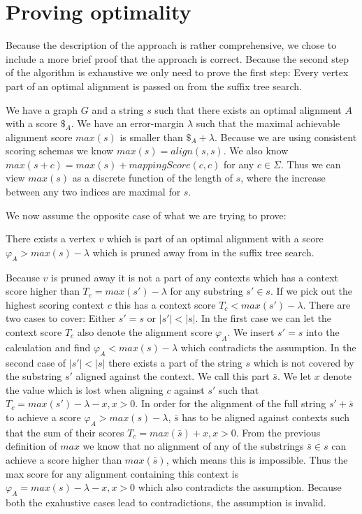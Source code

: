 \documentclass[thesis.tex]{subfiles}
\begin{document}
\chapter{Proving optimality}
\label{sec:proof}
Because the description of the approach is rather comprehensive, we chose to include a more brief proof that the approach is correct. Because the second step of the algorithm is exhaustive we only need to prove the first step: Every vertex part of an optimal alignment is passed on from the suffix tree search.\\
\par\noindent
We have a graph $G$ and a string $s$ such that there exists an optimal alignment $A$ with a score $\$_A$. We have an error-margin $\lambda$ such that the maximal achievable alignment score $max(s)$ is smaller than $\$_A + \lambda$. Because we are using consistent scoring schemas we know $max(s) = align(s, s)$. We also know $max(s+c)=max(s)+mappingScore(c, c)$ for any $c \in \Sigma$. Thus we can view $max(s)$ as a discrete function of the length of $s$, where the increase between any two indices are maximal for $s$.\\
\par\noindent
We now assume the opposite case of what we are trying to prove:
\begin{assumption}
\label{assumption}
There exists a vertex $v$ which is part of an optimal alignment with a score $\varphi_A>max(s)-\lambda$ which is pruned away from in the suffix tree search.
\end{assumption}
\noindent
Because $v$ is pruned away it is not a part of any contexts which has a context score higher than $T_c=max(s')-\lambda$ for any substring $s' \in s$. If we pick out the highest scoring context $c$ this has a context score $T_c<max(s')-\lambda$. There are two cases to cover: Either $s'=s$ or $|s'|<|s|$. In the first case we can let the context score $T_c$ also denote the alignment score $\varphi_A$. We insert $s'=s$ into the calculation and find $\varphi_A<max(s)-\lambda$ which contradicts the assumption. In the second case of $|s'|<|s|$ there exists a part of the string $s$ which is not covered by the substring $s'$ aligned against the context. We call this part $\bar{s}$. We let $x$ denote the value which is lost when aligning $c$ against $s'$ such that $T_c=max(s')-\lambda-x,x>0$. In order for the alignment of the full string $s'+\bar{s}$ to achieve a score $\varphi_A>max(s)-\lambda$, $\bar{s}$ has to be aligned against contexts such that the sum of their scores $T_c=max(\bar{s})+x,x>0$. From the previous definition of $max$ we know that no alignment of any of the substrings $\bar{s} \in s$ can achieve a score higher than $max(\bar{s})$, which means this is impossible. Thus the max score for any alignment containing this context is $\varphi_A=max(s)-\lambda-x,x>0$ which also contradicts the assumption. Because both the exahustive cases lead to contradictions, the assumption is invalid.
\end{document}
